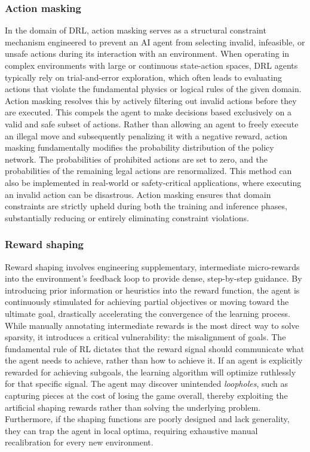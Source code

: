 \subsubsection{Action masking}
In the domain of DRL, action masking serves as a structural constraint mechanism engineered to prevent an AI agent from selecting invalid, infeasible, or unsafe actions during its interaction with an environment. When operating in complex environments with large or continuous state-action spaces, DRL agents typically rely on trial-and-error exploration, which often leads to evaluating actions that violate the fundamental physics or logical rules of the given domain. Action masking resolves this by actively filtering out invalid actions before they are executed. This compels the agent to make decisions based exclusively on a valid and safe subset of actions.
Rather than allowing an agent to freely execute an illegal move and subsequently penalizing it with a negative reward, action masking fundamentally modifies the probability distribution of the policy network. The probabilities of prohibited actions are set to zero, and the probabilities of the remaining legal actions are renormalized. This method can also be implemented in real-world or safety-critical applications, where executing an invalid action can be disastrous. Action masking ensures that domain constraints are strictly upheld during both the training and inference phases, substantially reducing or entirely eliminating constraint violations.  \cite{Action_masking}
\subsubsection{Reward shaping}
Reward shaping involves engineering supplementary, intermediate micro-rewards into the environment's feedback loop to provide dense, step-by-step guidance. By introducing prior information or heuristics into the reward function, the agent is continuously stimulated for achieving partial objectives or moving toward the ultimate goal, drastically accelerating the convergence of the learning process. While manually annotating intermediate rewards is the most direct way to solve sparsity, it introduces a critical vulnerability: the misalignment of goals. The fundamental rule of RL dictates that the reward signal should communicate what the agent needs to achieve, rather than how to achieve it. If an agent is explicitly rewarded for achieving subgoals, the learning algorithm will optimize ruthlessly for that specific signal. The agent may discover unintended \textit{loopholes}, such as capturing pieces at the cost of losing the game overall, thereby exploiting the artificial shaping rewards rather than solving the underlying problem. Furthermore, if the shaping functions are poorly designed and lack generality, they can trap the agent in local optima, requiring exhaustive manual recalibration for every new environment. \cite{SparseRewardProblem}
